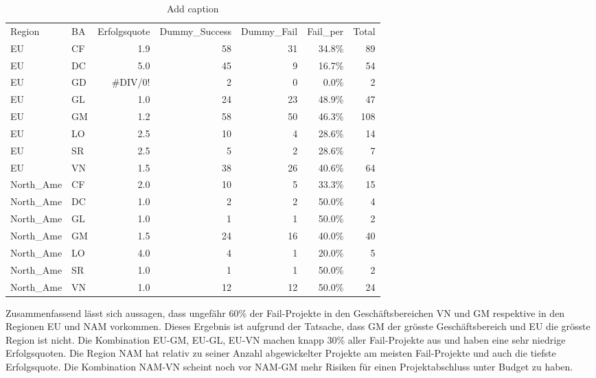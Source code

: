 \begin{table}[htbp]
	\centering
	\caption{Add caption}
	\begin{tabular}{llrrrrr}
		Region & BA    & \multicolumn{1}{l}{Erfolgsquote} & \multicolumn{1}{l}{Dummy\_Success} & \multicolumn{1}{l}{Dummy\_Fail} & \multicolumn{1}{l}{Fail\_per} & \multicolumn{1}{l}{Total} \\
		EU    & CF    & 1.9   & 58    & 31    & 34.8\% & 89 \\
		EU    & DC    & 5.0   & 45    & 9     & 16.7\% & 54 \\
		EU    & GD    & \#DIV/0! & 2     & 0     & 0.0\% & 2 \\
		EU    & GL    & 1.0   & 24    & 23    & 48.9\% & 47 \\
		EU    & GM    & 1.2   & 58    & 50    & 46.3\% & 108 \\
		EU    & LO    & 2.5   & 10    & 4     & 28.6\% & 14 \\
		EU    & SR    & 2.5   & 5     & 2     & 28.6\% & 7 \\
		EU    & VN    & 1.5   & 38    & 26    & 40.6\% & 64 \\
		North\_Ame & CF    & 2.0   & 10    & 5     & 33.3\% & 15 \\
		North\_Ame & DC    & 1.0   & 2     & 2     & 50.0\% & 4 \\
		North\_Ame & GL    & 1.0   & 1     & 1     & 50.0\% & 2 \\
		North\_Ame & GM    & 1.5   & 24    & 16    & 40.0\% & 40 \\
		North\_Ame & LO    & 4.0   & 4     & 1     & 20.0\% & 5 \\
		North\_Ame & SR    & 1.0   & 1     & 1     & 50.0\% & 2 \\
		North\_Ame & VN    & 1.0   & 12    & 12    & 50.0\% & 24 \\
	\end{tabular}%
	\label{tab:addlabel}%
\end{table}%
Zusammenfassend lässt sich aussagen, dass ungefähr 60\% der Fail-Projekte in den Geschäftsbereichen VN und GM respektive in den Regionen EU und NAM vorkommen. Dieses Ergebnis ist aufgrund der Tatsache, dass GM der grösste Geschäftsbereich und EU die grösste Region ist nicht. Die Kombination EU-GM, EU-GL, EU-VN machen knapp 30\% aller Fail-Projekte aus und haben eine sehr niedrige Erfolgsquoten. Die Region NAM hat relativ zu seiner Anzahl abgewickelter Projekte am meisten Fail-Projekte und auch die tiefste Erfolgsquote. Die Kombination NAM-VN scheint noch vor NAM-GM mehr Risiken für einen Projektabschluss unter Budget zu haben.
